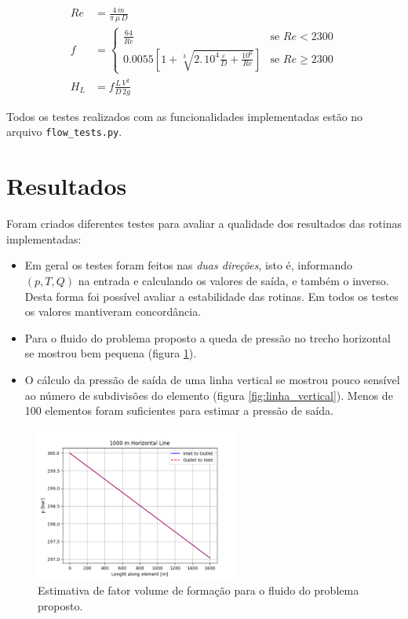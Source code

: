 \documentclass[final,3p]{elsarticle}
\numberwithin{equation}{section}
\begin{document}
        \begin{align}
          Re &= \frac{4 \, \dot{m}}{\pi \, \mu \, D} \label{eq:reynolds} \\
          f &=
          \begin{cases}
            \frac{64}{Re} & \text{se } Re < 2300 \\
            0.0055 \left[ 1+ \sqrt[3]{2.\,10^4 \frac{\varepsilon}{D} + \frac{10^6}{Re}}   \right]     & \text{se } Re \geq 2300
        \end{cases} \label{eq:ff} \\
          H_L &= f \frac{L \, V^2}{D \, 2g} \label{eq:hloss}
        \end{align}

        Todos os testes realizados com as funcionalidades implementadas estão no arquivo \texttt{flow\_tests.py}.

\section{Resultados}

        Foram criados diferentes testes para avaliar a qualidade dos resultados das rotinas implementadas:

        \begin{itemize}
          \item Em geral os testes foram feitos nas \emph{duas direções}, isto é, informando $(p,T,Q)$ na entrada e calculando os valores de saída, e também o inverso. Desta forma foi possível avaliar a estabilidade das rotinas. Em todos os testes os valores mantiveram concordância.
          \item Para o fluido do problema proposto a queda de pressão no trecho horizontal se mostrou bem pequena (figura \ref{fig:linha_horizontal}).
          \item O cálculo da pressão de saída de uma linha vertical se mostrou pouco sensível ao número de subdivisões do elemento (figura \ref{fig:linha_vertical}). Menos de 100 elementos foram suficientes para estimar a pressão de saída.
        \end{itemize}

        \begin{figure}
          \centering
          \includegraphics[width=0.6\textwidth]{flow/horizontal.png}
          \caption{Estimativa de fator volume de formação para o fluido do problema proposto.}
          \label{fig:linha_horizontal}
        \end{figure}
\end{document}
